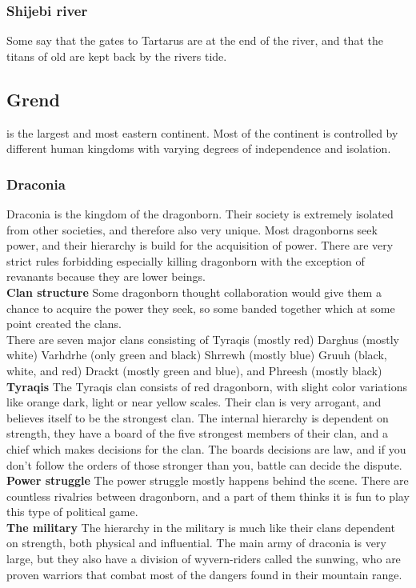 \documentclass[a4paper]{article}
\begin{document}
\subsubsection{Shijebi river}
Some say that the gates to Tartarus are at the end of the river, and that the titans of old are kept back by the rivers tide.


\subsection{Grend}
is the largest and most eastern continent. Most of the continent is controlled by different human kingdoms with varying degrees of independence and isolation.

\subsubsection{Draconia}
Draconia is the kingdom of the dragonborn. Their society is extremely isolated from other societies, and therefore also very unique. Most dragonborns seek power, and their hierarchy is build for the acquisition of power. There are very strict rules forbidding especially killing dragonborn with the exception of revanants because they are lower beings.
\\
\textbf{Clan structure}
Some dragonborn thought collaboration would give them a chance to acquire the power they seek, so some banded together which at some point created the clans.
\\
There are seven major clans consisting of Tyraqis (mostly red) Darghus (mostly white) Varhdrhe (only green and black) Shrrewh (mostly blue) Gruuh (black, white, and red) Drackt (mostly green and blue), and Phreesh (mostly black)
\\
\textbf{Tyraqis}
The Tyraqis clan consists of red dragonborn, with slight color variations like orange dark, light or  near yellow scales. Their clan is very arrogant, and believes itself to be the strongest clan. The internal hierarchy is dependent on strength, they have a board of the five strongest members of their clan, and a chief which makes decisions for the clan. The boards decisions are law, and if you don't follow the orders of those stronger than you, battle can decide the dispute.
\\
\textbf{Power struggle}
The power struggle mostly happens behind the scene. There are countless rivalries between dragonborn, and a part of them thinks it is fun to play this type of political game. 
\\
\textbf{The military}
The hierarchy in the military is much like their clans dependent on strength, both physical and influential. The main army of draconia is very large, but they also have a division of wyvern-riders called the sunwing, who are proven warriors that combat most of the dangers found in their mountain range.
\end{document}
